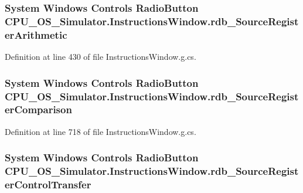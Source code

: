 \subsubsection[{rdb\+\_\+\+Source\+Register\+Arithmetic}]{\setlength{\rightskip}{0pt plus 5cm}System Windows Controls Radio\+Button C\+P\+U\+\_\+\+O\+S\+\_\+\+Simulator.\+Instructions\+Window.\+rdb\+\_\+\+Source\+Register\+Arithmetic\hspace{0.3cm}{\ttfamily [package]}}\label{class_c_p_u___o_s___simulator_1_1_instructions_window_ad571b65d5fe87bdb079c807dcac0680f}


Definition at line 430 of file Instructions\+Window.\+g.\+cs.

\hypertarget{class_c_p_u___o_s___simulator_1_1_instructions_window_afa2620b93d7d354b0632d7c290022545}{}
\subsubsection[{rdb\+\_\+\+Source\+Register\+Comparison}]{\setlength{\rightskip}{0pt plus 5cm}System Windows Controls Radio\+Button C\+P\+U\+\_\+\+O\+S\+\_\+\+Simulator.\+Instructions\+Window.\+rdb\+\_\+\+Source\+Register\+Comparison\hspace{0.3cm}{\ttfamily [package]}}\label{class_c_p_u___o_s___simulator_1_1_instructions_window_afa2620b93d7d354b0632d7c290022545}


Definition at line 718 of file Instructions\+Window.\+g.\+cs.

\hypertarget{class_c_p_u___o_s___simulator_1_1_instructions_window_a63fea6d97a26f4ed71753209dac85d24}{}
\subsubsection[{rdb\+\_\+\+Source\+Register\+Control\+Transfer}]{\setlength{\rightskip}{0pt plus 5cm}System Windows Controls Radio\+Button C\+P\+U\+\_\+\+O\+S\+\_\+\+Simulator.\+Instructions\+Window.\+rdb\+\_\+\+Source\+Register\+Control\+Transfer\hspace{0.3cm}{\ttfamily [package]}}\label{class_c_p_u___o_s___simulator_1_1_instructions_window_a63fea6d97a26f4ed71753209dac85d24}


